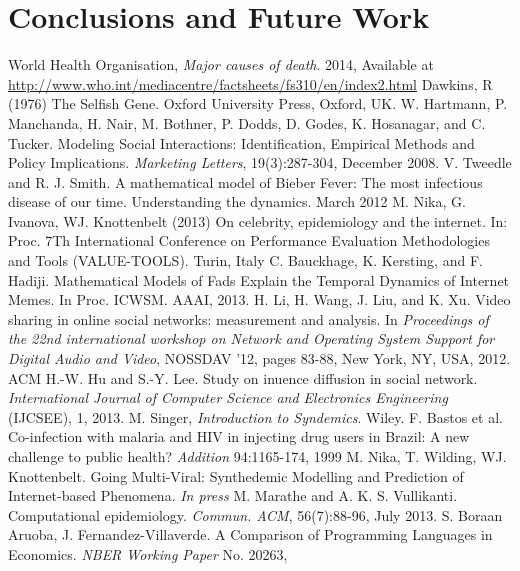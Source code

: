 \documentclass[11pt, a4paper, oneside,titlepage]{article}
\begin{document}
\newpage
\section{Conclusions and Future Work}

\begin{thebibliography}{1}
		World Health Organisation,
		\emph{Major causes of death}.
		2014,
		Available at \url{http://www.who.int/mediacentre/factsheets/fs310/en/index2.html}
		Dawkins, R (1976) The Selfish Gene. Oxford University Press, Oxford, UK.
		W. Hartmann, P. Manchanda, H. Nair, M. Bothner, P. Dodds, D. Godes, K. Hosanagar, and C. Tucker. Modeling Social Interactions: Identification, Empirical Methods and Policy Implications. \emph{Marketing Letters}, 19(3):287-304, December 2008.
		V. Tweedle and R. J. Smith. A mathematical model of Bieber Fever: The most infectious disease of our time. Understanding the dynamics. March 2012
		M. Nika, G. Ivanova, WJ. Knottenbelt (2013) On celebrity, epidemiology and the internet. In: Proc. 7Th International Conference on Performance Evaluation Methodologies and Tools (VALUE-TOOLS). Turin, Italy
		C. Bauckhage, K. Kersting, and F. Hadiji. Mathematical Models of Fads Explain the Temporal Dynamics of Internet Memes. In Proc. ICWSM. AAAI, 2013.
	H. Li, H. Wang, J. Liu, and K. Xu. Video sharing in online social networks: measurement and analysis. In \emph{Proceedings of the 22nd international workshop on Network and Operating System Support for Digital Audio and Video}, NOSSDAV '12, pages 83-88, New York, NY, USA, 2012. ACM
		H.-W. Hu and S.-Y. Lee. Study on inuence diffusion in social network. \emph{International Journal of Computer Science and Electronics Engineering} (IJCSEE), 1, 2013.
		M. Singer, \emph{Introduction to Syndemics}. Wiley.
		F. Bastos et al. Co-infection with malaria and HIV in injecting drug users in Brazil: A new challenge to public health? \emph{Addition} 94:1165-174, 1999
	M. Nika, T. Wilding, WJ. Knottenbelt. Going Multi-Viral: Synthedemic Modelling and Prediction of Internet-based Phenomena. \emph{In press}
	M. Marathe and A. K. S. Vullikanti. Computational
        epidemiology. \emph{Commun. ACM}, 56(7):88-96, July 2013.
         S. Boraan Aruoba,
          J. Fernandez-Villaverde. A Comparison of Programming
          Languages in Economics. \emph{NBER Working Paper} No. 20263,

\end{thebibliography}
\end{document}
